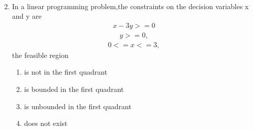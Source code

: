 \documentclass{article}
\begin{document}
\begin{enumerate}
\begin{enumerate}[label=(\Alph*)]
\begin{align}
                               \end{align}
		\end{enumerate}
	\item In a linear programming problem,the constraints on the decision variables x and y are 
		\begin{align}
		   x-3y>=0
		\end{align}
		\begin{align}
		   y>=0,
		\end{align}
		\begin{align}
		   0<=x<=3,
		\end{align}
		the feasible region 
		\begin{enumerate}[label=(\Alph*)]
			\item is not in the first quadrant
			\item is bounded in the first quadrant
			\item is unbounded in the first quadrant
			\item does not exist
		\end{enumerate}
 \end{enumerate}
 
\end{document}
